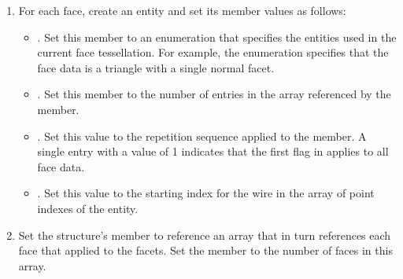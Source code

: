 \documentclass[letterpaper,12pt,english,openany,oneside]{sphinxmanual}
\begin{document}
\begin{sphinxVerbatim}[commandchars=\\\{\}]
\PYG{p}{[}\PYG{p}{]}  
\PYG{p}{[}\PYG{p}{]}  
\PYG{p}{[}\PYG{p}{]}  
\end{sphinxVerbatim}
\begin{enumerate}
%
\setcounter{enumi}{3}
\item {} 
For each face, create an  entity and set its member values as follows:
\begin{itemize}
\item {} 
. Set this member to an enumeration that specifies the entities used in the current face tessellation. For example, the  enumeration specifies that the face data is a triangle with a single normal facet.

\item {} 
. Set this member to the number of entries in the array referenced by the  member.

\item {} 
. Set this value to the repetition sequence applied to the  member. A single entry with a value of 1 indicates that the first flag in  applies to all face data.

\item {} 
. Set this value to the starting index for the wire in the array of point indexes of the  entity.

\end{itemize}

\item {} 
Set the  structure’s  member to reference an array that in turn references each face that applied to the facets. Set the  member to the number of faces in this array.


\end{enumerate}
\end{document}
